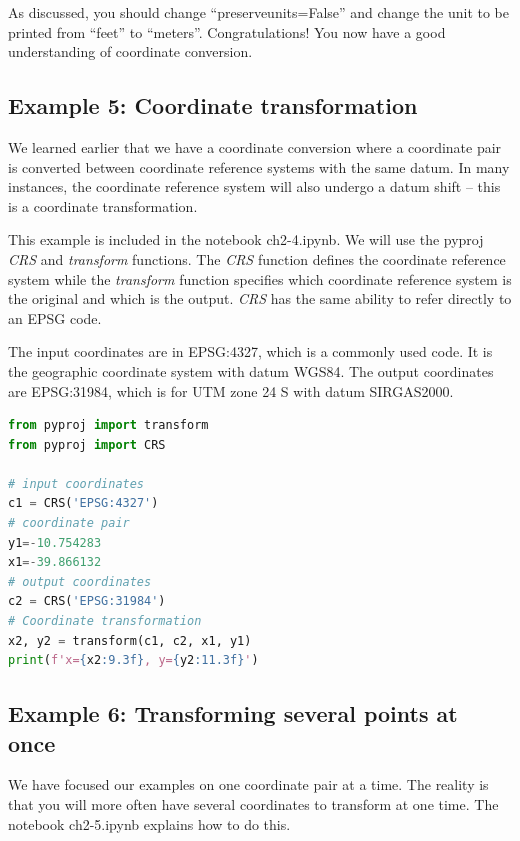 \documentclass[a4paper , 12pt]{book}
\begin{document}
As discussed, you should change “preserve\textunderscore units=False” and change the unit to be printed from “feet” to “meters”. Congratulations! You now have a good understanding of coordinate conversion.

\subsection*{Example 5: Coordinate transformation}

We learned earlier that we have a coordinate conversion where a coordinate pair is converted between coordinate reference systems with the same datum. In many instances, the coordinate reference system will also undergo a datum shift – this is a coordinate transformation.

This example is included in the notebook ch2-4.ipynb. We will use the pyproj \textit{CRS} and \textit{transform} functions. The \textit{CRS} function defines the coordinate reference system while the \textit{transform} function specifies which coordinate reference system is the original and which is the output. \textit{CRS} has the same ability to refer directly to an EPSG code.

The input coordinates are in EPSG:4327, which is a commonly used code. It is the geographic coordinate system with datum WGS84. The output coordinates are EPSG:31984, which is for UTM zone 24 S with datum SIRGAS2000.

\begin{center}
\begin{lstlisting}[language=Python, frame=single]
from pyproj import transform
from pyproj import CRS

# input coordinates
c1 = CRS('EPSG:4327')
# coordinate pair
y1=-10.754283
x1=-39.866132
# output coordinates
c2 = CRS('EPSG:31984')
# Coordinate transformation
x2, y2 = transform(c1, c2, x1, y1)
print(f'x={x2:9.3f}, y={y2:11.3f}')
\end{lstlisting}
\end{center}

\subsection*{Example 6: Transforming several points at once}

We have focused our examples on one coordinate pair at a time. The reality is that you will more often have several coordinates to transform at one time. The notebook ch2-5.ipynb explains how to do this.
\end{document}

